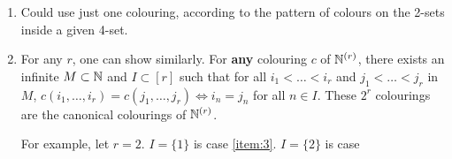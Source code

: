 \begin{remark}
  \begin{enumerate}
  \item Could use just one colouring, according to the pattern of
    colours on the 2-sets inside a given 4-set.
  \item For any $r$, one can show similarly.  For \textbf{any}
    colouring $c$ of $\mathbb{N}^{(r)}$, there exists an infinite $M \subset
    \mathbb{N}$ and $I \subset [r]$ such that for all $i_{1} < \dots < i_{r}$
    and $j_{1} < \dots < j_{r}$ in $M$, $c(i_1, \dots, i_{r}) =
    c(j_{1}, \dots, j_{r}) \iff i_{n} = j_{n}$ for all $n \in I$.
    These $2^{r}$ colourings are the canonical colourings of
    $\mathbb{N}^{(r)}$.  

    For example, let $r = 2$.  $I = \{ 1 \}$ is case \ref{item:3}.
    $I = \{ 2 \}$ is case 
  \end{enumerate}
\end{remark}

